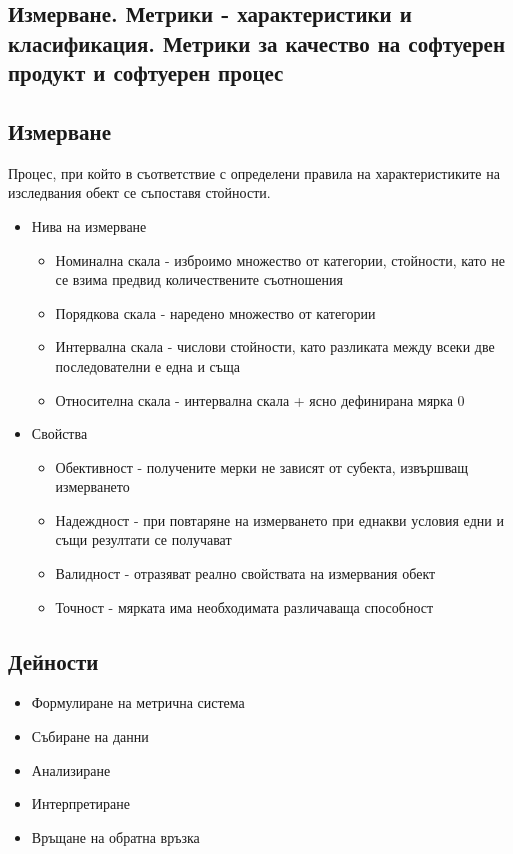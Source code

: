 \documentclass[fleqn,12pt]{article}
\begin{document}
\begin{flushleft}
\section{Измерване. Метрики - характеристики и класификация. Метрики за качество на софтуерен продукт и софтуерен процес}
\subsection{Измерване}
Процес, при който в съответствие с определени правила на характеристиките на изследвания обект се съпоставя стойности.
\begin{itemize}
    \item Нива на измерване
        \begin{itemize}
            \item Номинална скала - изброимо множество от категории, стойности, като не се взима предвид количествените съотношения
            \item Порядкова скала - наредено множество от категории
            \item Интервална скала - числови стойности, като разликата между всеки две последователни е една и съща
            \item Относителна скала - интервална скала + ясно дефинирана мярка 0
        \end{itemize}
    \item Свойства
        \begin{itemize}
            \item Обективност - получените мерки не зависят от субекта, извършващ измерването
            \item Надеждност - при повтаряне на измерването при еднакви условия едни и същи резултати се получават
            \item Валидност - отразяват реално свойствата на измервания обект
            \item Точност - мярката има необходимата различаваща способност
        \end{itemize}
\end{itemize}

\subsection{Дейности}
    \begin{itemize}
        \item Формулиране на метрична система
        \item Събиране на данни
        \item Анализиране
        \item Интерпретиране
        \item Връщане на обратна връзка
    \end{itemize}


\end{flushleft}
\end{document}
